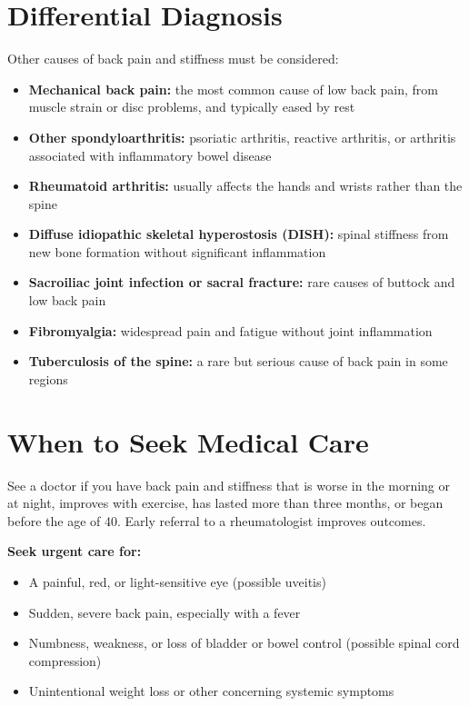 \section*{Differential Diagnosis}
Other causes of back pain and stiffness must be considered:

\begin{itemize}
    \item \textbf{Mechanical back pain:} the most common cause of low back pain, from muscle strain or disc problems, and typically eased by rest
    \item \textbf{Other spondyloarthritis:} psoriatic arthritis, reactive arthritis, or arthritis associated with inflammatory bowel disease
    \item \textbf{Rheumatoid arthritis:} usually affects the hands and wrists rather than the spine
    \item \textbf{Diffuse idiopathic skeletal hyperostosis (DISH):} spinal stiffness from new bone formation without significant inflammation
    \item \textbf{Sacroiliac joint infection or sacral fracture:} rare causes of buttock and low back pain
    \item \textbf{Fibromyalgia:} widespread pain and fatigue without joint inflammation
    \item \textbf{Tuberculosis of the spine:} a rare but serious cause of back pain in some regions
\end{itemize}

\section*{When to Seek Medical Care}
See a doctor if you have back pain and stiffness that is worse in the morning or at night, improves with exercise, has lasted more than three months, or began before the age of 40. Early referral to a rheumatologist improves outcomes.

\textbf{Seek urgent care for:}
\begin{itemize}
    \item A painful, red, or light-sensitive eye (possible uveitis)
    \item Sudden, severe back pain, especially with a fever
    \item Numbness, weakness, or loss of bladder or bowel control (possible spinal cord compression)
    \item Unintentional weight loss or other concerning systemic symptoms
\end{itemize}

